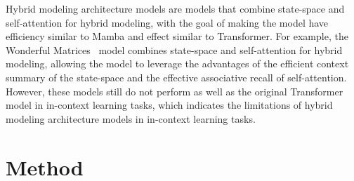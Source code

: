 \documentclass{article}
\theoremstyle{plain}
\theoremstyle{definition}
\theoremstyle{remark}
\begin{document}
Hybrid modeling architecture models are models that combine state-space and self-attention for hybrid modeling, with the goal of making the model have efficiency similar to Mamba and effect similar to Transformer. For example, the Wonderful Matrices~\cite{shi2024wonderfulmatrices} model combines state-space and self-attention for hybrid modeling, allowing the model to leverage the advantages of the efficient context summary of the state-space and the effective associative recall of self-attention. However, these models still do not perform as well as the original Transformer model in in-context learning tasks, which indicates the limitations of hybrid modeling architecture models in in-context learning tasks.







\section{Method}
\end{document}
